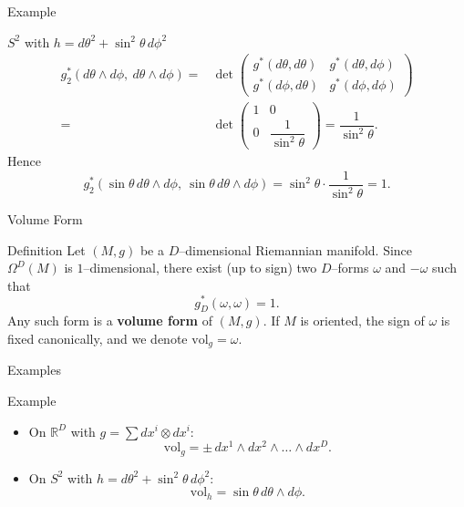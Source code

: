 \begin{frame}{Example}
\vspace{-0.3cm}
\begin{block}{$S^2$ with $h=d\theta^2+\sin^2\theta\,d\phi^2$}
\vspace{-0.8cm}
\begin{align*}
g_2^*(d\theta\wedge d\phi,\ d\theta\wedge d\phi)
=&\det
\begin{pmatrix}
g^*(d\theta,d\theta) & g^*(d\theta,d\phi)\\
g^*(d\phi,d\theta) & g^*(d\phi,d\phi)
\end{pmatrix}\\
=&\det
\begin{pmatrix}
1 & 0\\
0 & \dfrac{1}{\sin^2\theta}
\end{pmatrix}
=\dfrac{1}{\sin^2\theta}.
\end{align*}
Hence
\vspace{-0.7cm}
\[
g_2^*(\sin\theta\,d\theta\wedge d\phi,\ \sin\theta\,d\theta\wedge d\phi)
=\sin^2\theta\cdot\dfrac{1}{\sin^2\theta}=1.
\]
\end{block}
\vspace{-0.9cm}
\begin{center}
\end{center}
\end{frame}

\begin{frame}{Volume Form}
\begin{block}{Definition}
Let $(M,g)$ be a $D$–dimensional Riemannian manifold.
Since $\Omega^D(M)$ is $1$–dimensional,
there exist (up to sign) two $D$–forms $\omega$ and $-\omega$
such that
\[
g^*_D(\omega,\omega)=1.
\]
Any such form is a \textbf{volume form} of $(M,g)$.
If $M$ is oriented, the sign of $\omega$ is fixed canonically,
and we denote $\mathrm{vol}_g=\omega$.
\end{block}
\end{frame}

\begin{frame}{Examples}
    \begin{block}{Example}
\begin{itemize}
\item On $\mathbb{R}^D$ with $g=\sum dx^i\otimes dx^i$:
\[
\mathrm{vol}_g=\pm\,dx^1\wedge dx^2\wedge\dots\wedge dx^D.
\]
\item On $S^2$ with $h=d\theta^2+\sin^2\theta\,d\phi^2$:
\[
\mathrm{vol}_h=\sin\theta\,d\theta\wedge d\phi.
\]
\end{itemize}
\end{block}
\end{frame}

